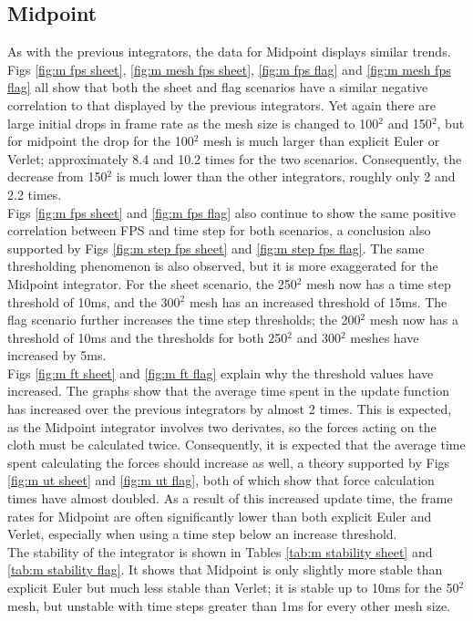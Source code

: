 \subsection{Midpoint}
As with the previous integrators, the data for Midpoint displays similar trends.
\\Figs \ref{fig:m fps sheet}, \ref{fig:m mesh fps sheet}, \ref{fig:m fps flag} and \ref{fig:m mesh fps flag} all show that both the sheet and flag scenarios have a similar negative correlation to that displayed by the previous integrators. Yet again there are large initial drops in frame rate as the mesh size is changed to 100$^{2}$ and 150$^{2}$, but for midpoint the drop for the 100$^{2}$ mesh is much larger than explicit Euler or Verlet; approximately 8.4 and 10.2 times for the two scenarios. Consequently, the decrease from 150$^{2}$ is much lower than the other integrators, roughly only 2 and 2.2 times.
\\Figs \ref{fig:m fps sheet} and \ref{fig:m fps flag} also continue to show the same positive correlation between FPS and time step for both scenarios, a conclusion also supported by Figs \ref{fig:m step fps sheet} and \ref{fig:m step fps flag}. The same thresholding phenomenon is also observed, but it is more exaggerated for the Midpoint integrator. For the sheet scenario, the 250$^{2}$ mesh now has a time step threshold of 10ms, and the 300$^{2}$ mesh has an increased threshold of 15ms. The flag scenario further increases the time step thresholds; the 200$^{2}$ mesh now has a threshold of 10ms and the thresholds for both 250$^{2}$ and 300$^{2}$ meshes have increased by 5ms.
\\Figs \ref{fig:m ft sheet} and \ref{fig:m ft flag} explain why the threshold values have increased. The graphs show that the average time spent in the update function has increased over the previous integrators by almost 2 times. This is expected, as the Midpoint integrator involves two derivates, so the forces acting on the cloth must be calculated twice. Consequently, it is expected that the average time spent calculating the forces should increase as well, a theory supported by Figs \ref{fig:m ut sheet} and \ref{fig:m ut flag}, both of which show that force calculation times have almost doubled. As a result of this increased update time, the frame rates for Midpoint are often significantly lower than both explicit Euler and Verlet, especially when using a time step below an increase threshold.
\\The stability of the integrator is shown in Tables \ref{tab:m stability sheet} and \ref{tab:m stability flag}. It shows that Midpoint is only slightly more stable than explicit Euler but much less stable than Verlet; it is stable up to 10ms for the 50$^{2}$ mesh, but unstable with time steps greater than 1ms for every other mesh size.
